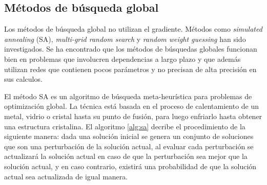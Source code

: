 


\subsection{Métodos de búsqueda global}
Los métodos de búsqueda global no utilizan el gradiente. Métodos como {\em simulated annealing} (SA), {\em multi-grid random search} \cite{Bengio1994} y {\em random weight guessing} \cite{Schmidhuber1996} han sido investigados. Se ha encontrado que los métodos de búsquedas globales funcionan bien en problemas que involucren dependencias a largo plazo y que además utilizan redes que contienen pocos parámetros y no precisan de alta precisión en sus calculos.

El método SA es un algoritmo de búsqueda meta-heurística para problemas de optimización global. La técnica está basada en el proceso de calentamiento de un metal, vidrio o cristal hasta su punto de fusión, para luego enfriarlo hasta obtener una estructura cristalina. El algoritmo \ref{alg:sa} decribe el procedimiento de la siguiente manera: dada una solución inicial se genera un conjunto de soluciones que son una perturbación de la solución actual, al evaluar cada perturbación se actualizará la solución actual en caso de que la perturbación sea mejor que la solución actual, y en caso contrario, existirá una probabilidad de que la solución actual sea actualizada de igual manera.




